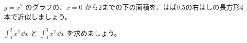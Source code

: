 \noindent\begin{minipage}[t]{0.485\linewidth}\vspace{0pt}\raggedright
\begin{jibun}
$y=x^2$ のグラフの、$x=0$ から2までの下の面積を、はば0.5の右はしの長方形4本で近似しましょう。
\end{jibun}
\end{minipage}\hfill
\begin{minipage}[t]{0.485\linewidth}\vspace{0pt}\raggedright
\begin{jibun}
$\displaystyle\int_0^2x^2\,\dd x$ と $\displaystyle\int_0^3x^2\,\dd x$ を求めましょう。
\end{jibun}
\end{minipage}

